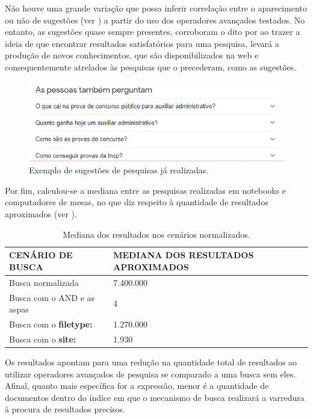 \documentclass[portuguese]{textolivre}
\begin{document}
Não houve uma grande variação que possa inferir correlação entre o aparecimento ou não de sugestões (ver ) a partir do uso dos operadores avançados testados. No entanto, as sugestões quase sempre presentes, corroboram o dito por \textcite{santos_avaliacao_2015} ao trazer a ideia de que encontrar resultados satisfatórios para uma pesquisa, levará a produção de novos conhecimentos, que são disponibilizados na web e consequentemente atrelados às pesquisas que o precederam, como as sugestões.

\begin{figure}[h!]
    \centering
    \includegraphics[width=0.8\linewidth]{fig-019.png}
    \caption{Exemplo de sugestões de pesquisas já realizadas.}
    \label{fig23}
\end{figure}

Por fim, calculou-se a mediana entre as pesquisas realizadas em notebooks e computadores de mesas, no que diz respeito à quantidade de resultados aproximados (ver ).

\begin{table}[h!]
\centering
\begin{threeparttable}
\caption{Mediana dos resultados nos cenários normalizados.}
\label{tab05}
\begin{tabular}{l l}
\toprule
 \textbf{CENÁRIO DE BUSCA} & \textbf{MEDIANA DOS RESULTADOS APROXIMADOS} \\
 \midrule
Busca normalizada & 7.400.000 \\
Busca com o AND e as aspas & 4 \\
Busca com o \textbf{filetype:} & 1.270.000 \\
Busca com o \textbf{site:} & 1.930 \\
\bottomrule
\end{tabular}
\end{threeparttable}
\end{table}

Os resultados apontam para uma redução na quantidade total de resultados ao utilizar operadores avançados de pesquisa se comparado a uma busca sem eles. Afinal, quanto mais específica for a expressão, menor é a quantidade de documentos dentro do índice em que o mecanismo de busca realizará a varredura à procura de resultados precisos.
\end{document}
